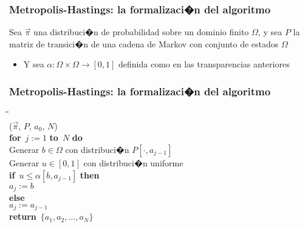 \documentclass{beamer}
\newcommand{\vs}[1]{\vspace{#1mm}}
\newcommand{\afor}{{\bf for}\ }
\newcommand{\ato}{{\bf to}\ }
\newcommand{\ado}{{\bf do}\ }
\newcommand{\aif}{{\bf if}\ }
\newcommand{\athen}{{\bf then}\ }
\newcommand{\aelse}{{\bf else}\ }
\newcommand{\areturn}{{\bf return}\ }
\begin{document}
	
	
	
	\begin{frame}
		\frametitle{Metropolis-Hastings: la formalizaci�n del algoritmo}
		
		{\footnotesize
			
			
			Sea $\vec \pi$ una distribuci�n de probabilidad sobre un dominio finito $\Omega$, y sea $P$ la matriz de transici�n de una cadena de Markov con conjunto de estados $\Omega$
			\begin{itemize}
				\item Y sea $\alpha: \Omega\times\Omega \to [0,1]$ definida como en las transparencias anteriores
			\end{itemize}
			
			\vs{6}
			
			
			\vs{6}
			
			
		}
		
	\end{frame}
	
	
	
	
	
	\begin{frame}
		\frametitle{Metropolis-Hastings: la formalizaci�n del algoritmo}
		
		{\small
			
			\begin{tabbing}
				\phantom{MM}\=\phantom{MM}\=\phantom{MM}\=\phantom{MM}\= \\
				($\vec \pi$, $P$, $a_0$, $N$) \\
				\> \afor $j:=1$ \ato $N$ \ado \\
				\> \> Generar $b \in \Omega$ con distribuci�n $P[\cdot, a_{j-1}]$\\
				\> \> Generar $u \in [0,1]$ con distribuci�n uniforme\\
				\> \> \aif $u \leq \alpha[b,a_{j-1}]$ \athen \\
				\> \> \> $a_{j} := b$ \\
				\> \> \aelse \\
				\> \> \> $a_{j} := a_{j-1}$ \\
				\> \areturn $\{a_1, a_2, \ldots, a_N\}$
			\end{tabbing}
			
		}
		
	\end{frame}
	
\end{document}

